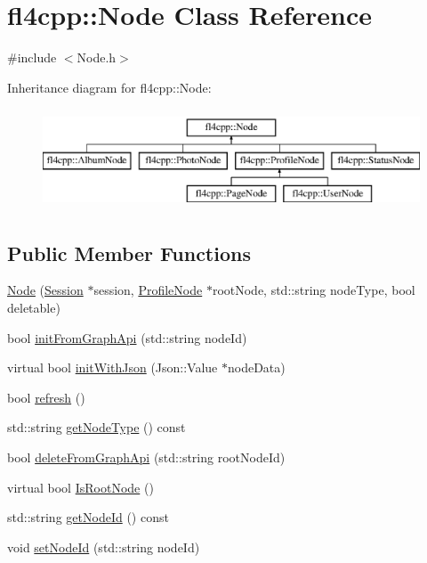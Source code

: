 \hypertarget{classfl4cpp_1_1_node}{}\section{fl4cpp\+:\+:Node Class Reference}
\label{classfl4cpp_1_1_node}


{\ttfamily \#include $<$Node.\+h$>$}

Inheritance diagram for fl4cpp\+:\+:Node\+:\begin{figure}[H]
\begin{center}
\leavevmode
\includegraphics[height=3.000000cm]{classfl4cpp_1_1_node}
\end{center}
\end{figure}
\subsection*{Public Member Functions}
\begin{DoxyCompactItemize}
\item 
\hyperlink{classfl4cpp_1_1_node_a4281ba1ddb761144744fab305344a0cd}{Node} (\hyperlink{classfl4cpp_1_1_session}{Session} $\ast$session, \hyperlink{classfl4cpp_1_1_profile_node}{Profile\+Node} $\ast$root\+Node, std\+::string node\+Type, bool deletable)
\item 
bool \hyperlink{classfl4cpp_1_1_node_a1dd4594ffd7eb08e9e8c5031d2109a59}{init\+From\+Graph\+Api} (std\+::string node\+Id)
\item 
virtual bool \hyperlink{classfl4cpp_1_1_node_aac67098119277a58b66459323ea03d87}{init\+With\+Json} (Json\+::\+Value $\ast$node\+Data)
\item 
bool \hyperlink{classfl4cpp_1_1_node_a7198bd2f0274e750addddaed8aacd4ee}{refresh} ()
\item 
std\+::string \hyperlink{classfl4cpp_1_1_node_a283f934ebdc50976333da6f36415bd51}{get\+Node\+Type} () const 
\item 
bool \hyperlink{classfl4cpp_1_1_node_a22ae4a0c8b90b61722dfc6896c679f44}{delete\+From\+Graph\+Api} (std\+::string root\+Node\+Id)
\item 
virtual bool \hyperlink{classfl4cpp_1_1_node_a0895f61dd4fd8d5a9d9048c0c099b363}{Is\+Root\+Node} ()
\item 
std\+::string \hyperlink{classfl4cpp_1_1_node_a61fd6c329a140c7fcd641131ddc6f026}{get\+Node\+Id} () const 
\item 
void \hyperlink{classfl4cpp_1_1_node_a424501ee1ba680541b70218d8ac6ff8b}{set\+Node\+Id} (std\+::string node\+Id)
\end{DoxyCompactItemize}
